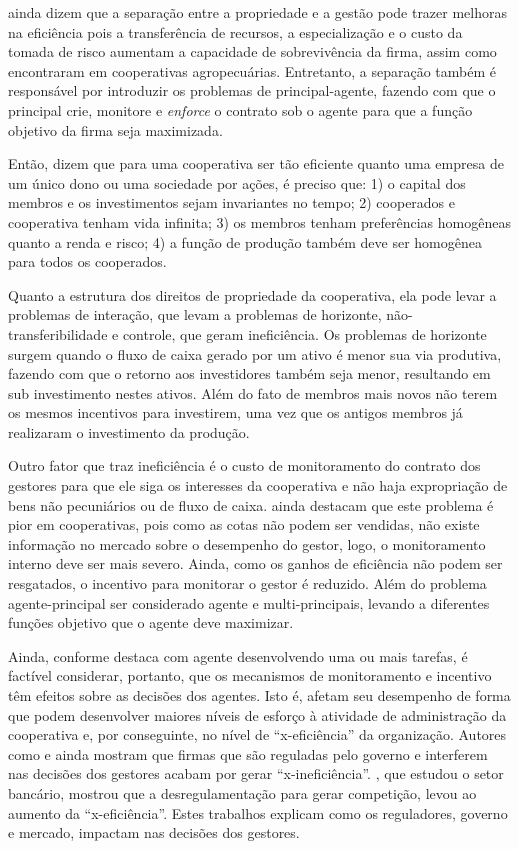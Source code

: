 \documentclass[ppgcc]{fearp}
\begin{document}
 ainda dizem que a separação entre a propriedade e a gestão pode trazer melhoras na eficiência pois a transferência de recursos, a especialização e o custo da tomada de risco aumentam a capacidade de sobrevivência da firma, assim como  encontraram em cooperativas agropecuárias. Entretanto, a separação também é responsável por introduzir os problemas de principal-agente, fazendo com que o principal crie, monitore e \textit{enforce} o contrato sob o agente para que a função objetivo da firma seja maximizada.

Então,  dizem que para uma cooperativa ser tão eficiente quanto uma empresa de um único dono ou uma sociedade por ações, é preciso que: 1) o capital dos membros e os investimentos sejam invariantes no tempo; 2) cooperados e cooperativa tenham vida infinita; 3) os membros tenham preferências homogêneas quanto a renda e risco; 4) a função de produção também deve ser homogênea para todos os cooperados.

Quanto a estrutura dos direitos de propriedade da cooperativa, ela pode levar a problemas de interação, que levam a problemas de horizonte, não-transferibilidade e controle, que geram ineficiência. Os problemas de horizonte surgem quando o fluxo de caixa gerado por um ativo é menor sua via produtiva, fazendo com que o retorno aos investidores também seja menor, resultando em sub investimento nestes ativos. Além do fato de membros mais novos não terem os mesmos incentivos para investirem, uma vez que os antigos membros já realizaram o investimento da produção.

Outro fator que traz ineficiência é o custo de monitoramento do contrato dos gestores para que ele siga os interesses da cooperativa e não haja expropriação de bens não pecuniários ou de fluxo de caixa.  ainda destacam que este problema é pior em cooperativas, pois como as cotas não podem ser vendidas, não existe informação no mercado sobre o desempenho do gestor, logo, o monitoramento interno deve ser mais severo. Ainda, como os ganhos de eficiência não podem ser resgatados, o incentivo para monitorar o gestor é reduzido. Além do problema agente-principal ser considerado agente e multi-principais, levando a diferentes funções objetivo que o agente deve maximizar.

Ainda, conforme destaca  com agente desenvolvendo uma ou mais tarefas, é factível considerar, portanto, que os mecanismos de monitoramento e incentivo têm efeitos sobre as decisões dos agentes. Isto é, afetam seu desempenho de forma que podem desenvolver maiores níveis de esforço à atividade de administração da cooperativa e, por conseguinte, no nível de “x-eficiência” da organização.
Autores como  e  ainda mostram que firmas que são reguladas pelo governo e interferem nas decisões dos gestores acabam por gerar “x-ineficiência”. , que estudou o setor bancário, mostrou que a desregulamentação para gerar competição, levou ao aumento da “x-eficiência”. Estes trabalhos explicam como os reguladores, governo e mercado, impactam nas decisões dos gestores. 
\end{document}
